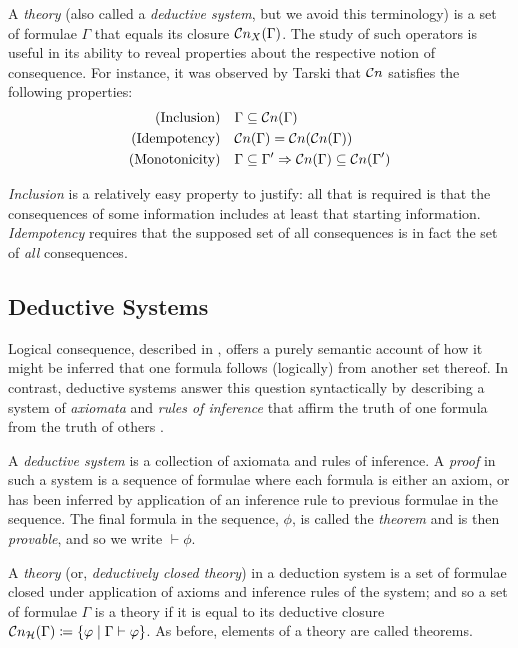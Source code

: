 A \textit{theory} (also called a \textit{deductive system}, but we avoid this terminology) is a set of formulae $\Gamma$ that equals its
closure $\mathcal{C}n_{X}(\Gamma)$. The study of such operators is useful in its ability to reveal properties about the respective notion of consequence.
For instance, it was observed by Tarski \cite[p. 84]{tarski1936operator} that $\mathcal{C}n$ satisfies the following properties:
%
\begin{align}
  \text{(Inclusion)}    & \quad \Gamma \subseteq \mathcal{C}n (\Gamma)                                               \\
  \text{(Idempotency)}  & \quad \mathcal{C}n (\Gamma) = \mathcal{C}n (\mathcal{C}n (\Gamma))                                       \\
  \text{(Monotonicity)} & \quad \Gamma \subseteq \Gamma' \Rightarrow \mathcal{C}n (\Gamma) \subseteq \mathcal{C}n (\Gamma')
\end{align}

\textit{Inclusion} is a relatively easy property to justify: all that is required is that the consequences of some information includes at least
that starting information. \textit{Idempotency} requires that the supposed set of all consequences is in fact the set of \textit{all}
consequences.

\subsection{Deductive Systems}
\label{subsection:deduction-systems}    Logical consequence, described in ,
offers a purely semantic account of how it might be inferred that one formula follows (logically) from another set thereof. In contrast,
deductive systems answer this question syntactically by describing a system of \textit{axiomata} and \textit{rules of inference} that affirm
the truth of one formula from the truth of others \cite[p. 49]{Ben1993Mathematical}.

\begin{definition}
  \label{definition:deductive-system} A \textit{deductive system} is a collection of axiomata and rules of inference. A \textit{proof} in
  such a system is a sequence of formulae where each formula is either an axiom, or has been inferred by application of an inference rule to
  previous formulae in the sequence. The final formula in the sequence, $\phi$, is called the \textit{theorem} and is then \textit{provable},
  and so we write $\vdash \phi$.

  A \textit{theory} (or, \textit{deductively closed theory}) in a deduction system is a set of formulae closed under application of axioms
  and inference rules of the system; and so a set of formulae $\Gamma$ is a theory if it is equal to its deductive closure $\mathcal{C}n_{\mathcal{H}}
  (\Gamma) \coloneqq \{\varphi \mid \Gamma \vdash \varphi \}$. As before, elements of a theory are called theorems.
\end{definition}


